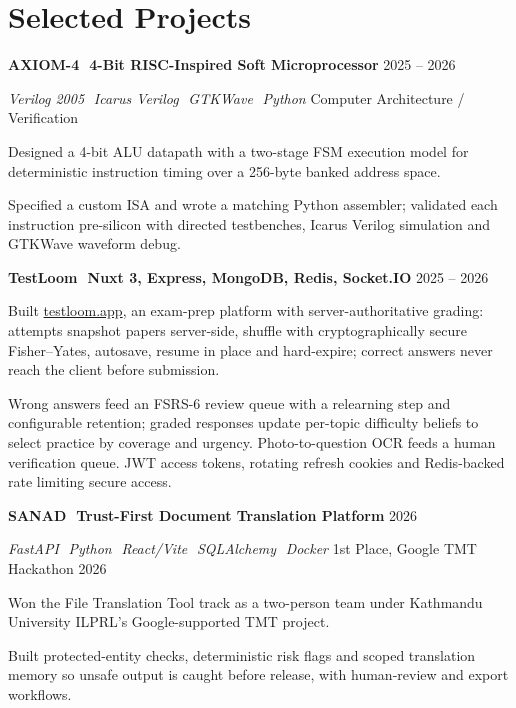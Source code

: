\documentclass[10pt,letterpaper]{article}
\newcommand{\entry}[2]{%
  \needspace{3\baselineskip}\vspace{2.1pt}%
  {\bfseries\fontsize{10.1}{11.8}\selectfont #1}\hfill
  {\fontsize{9.1}{11}\selectfont\color{slate}#2}\par\vspace{0.4pt}}
\newcommand{\subentry}[2]{%
  {\fontsize{9.4}{11}\selectfont\itshape\color{deepnavy}#1}\hfill
  {\fontsize{9.1}{11}\selectfont\color{slate}#2}\par\vspace{0.8pt}}
\newcommand{\divider}{\textcolor{accentblue}{\,\textbar\,}}
\begin{document}
\section{Selected Projects}
\entry{AXIOM-4 \divider 4-Bit RISC-Inspired Soft Microprocessor}{2025 -- 2026}
\subentry{Verilog 2005 \divider Icarus Verilog \divider GTKWave \divider Python}{Computer Architecture / Verification}
\begin{tight}
  \item Designed a 4-bit ALU datapath with a two-stage FSM execution model for deterministic instruction timing over a 256-byte banked address space.
  \item Specified a custom ISA and wrote a matching Python assembler; validated each instruction pre-silicon with directed testbenches, Icarus Verilog simulation and GTKWave waveform debug.
\end{tight}

\entry{TestLoom \divider Nuxt 3, Express, MongoDB, Redis, Socket.IO}{2025 -- 2026}
\begin{tight}
  \item Built \href{https://testloom.app}{testloom.app}, an exam-prep platform with server-authoritative grading: attempts snapshot papers server-side, shuffle with cryptographically secure Fisher--Yates, autosave, resume in place and hard-expire; correct answers never reach the client before submission.
  \item Wrong answers feed an FSRS-6 review queue with a relearning step and configurable retention; graded responses update per-topic difficulty beliefs to select practice by coverage and urgency. Photo-to-question OCR feeds a human verification queue. JWT access tokens, rotating refresh cookies and Redis-backed rate limiting secure access.
\end{tight}

\entry{SANAD \divider Trust-First Document Translation Platform}{2026}
\subentry{FastAPI \divider Python \divider React/Vite \divider SQLAlchemy \divider Docker}{1st Place, Google TMT Hackathon 2026}
\begin{tight}
  \item Won the File Translation Tool track as a two-person team under Kathmandu University ILPRL's Google-supported TMT project.
  \item Built protected-entity checks, deterministic risk flags and scoped translation memory so unsafe output is caught before release, with human-review and export workflows.
\end{tight}
\end{document}

